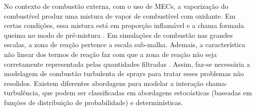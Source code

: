 No contexto de combustão externa, com o uso de MECs, a vaporização do combustível produz uma mistura de vapor de combustível com oxidante.
Em certas condições, essa mistura está em proporção inflamável e a chama formada queima no modo de pré-mistura \cite{PoinsotVeynante2005}.
Em simulações de combustão nas grandes escalas, a zona de reação pertence a escala sub-malha.
Ademais, a característica não linear dos termos de reação faz com que a zona de reação não seja corretamente representada pelas quantidades filtradas \cite{SacomanoF2017PhD}.
Assim, faz-se necessária a modelagem de combustão turbulenta de sprays para tratar esses problemas não resolidos.
Existem diferentes abordagens para modelar a interação chama-turbulência, que podem ser classificadas em abordagens estocásticas (baseadas em funções de distribuição de probabilidade) e  determinísticas.

